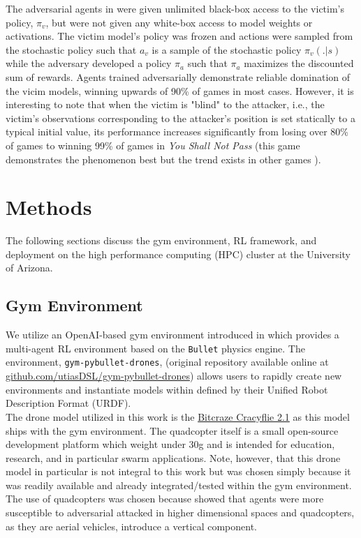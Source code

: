 \documentclass{article}
\begin{document}
\noindent 
The adversarial agents in \cite{Gleave2019} were given unlimited black-box access to the victim's policy, $\pi_v$, but were not given any white-box access to model weights or activations. 
The victim model's policy was frozen and actions were sampled from the stochastic policy such that $a_v$ is a sample of the stochastic policy $\pi_v(. | s)$ while the adversary developed a policy $\pi_a$ such that $\pi_a$ maximizes the discounted sum of rewards. 
Agents trained adversarially demonstrate reliable domination of the vicim models, winning upwards of 90\% of games in most cases. 
However, it is interesting to note that when the victim is "blind" to the attacker, i.e., the victim's observations corresponding to the attacker's position is set statically to a typical initial value, its performance increases significantly from losing over 80\% of games to winning 99\% of games in \textit{You Shall Not Pass} (this game demonstrates the phenomenon best but the trend exists in other games \cite{Gleave2019} ). 

\section{Methods}\label{sec:methods}
The following sections discuss the gym environment, RL framework, and deployment on the high performance computing (HPC) cluster at the University of Arizona.

\subsection{Gym Environment}\label{subsec:gym_env}
We utilize an OpenAI-based gym environment introduced in \cite{Panerati2021} which provides a multi-agent RL environment based on the \texttt{Bullet} physics engine. 
The environment, \texttt{gym-pybullet-drones}, (original repository available online at \url{github.com/utiasDSL/gym-pybullet-drones}) allows users to rapidly create new environments and instantiate models within defined by their Unified Robot Description Format (URDF). \\

\noindent
The drone model utilized in this work is the \href{https://www.bitcraze.io/documentation/hardware/crazyflie_2_1/crazyflie_2_1-datasheet.pdf}{Bitcraze Cracyflie 2.1} as this model ships with the gym environment. 
The quadcopter itself is a small open-source development platform which weight under 30g and is intended for education, research, and in particular swarm applications. 
Note, however, that this drone model in particular is not integral to this work but was chosen simply because it was readily available and already integrated/tested within the gym environment.
The use of quadcopters was chosen because \cite{Gleave2019}  showed that agents were more susceptible to adversarial attacked in higher dimensional spaces and quadcopters, as they are aerial vehicles, introduce a vertical component. 
\end{document}
